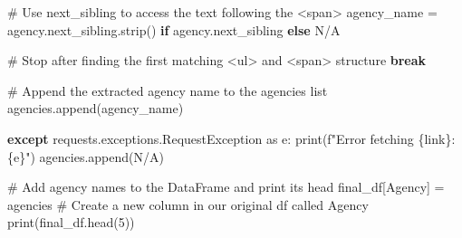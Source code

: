 \documentclass[
  letterpaper,
  DIV=11,
  numbers=noendperiod]{scrartcl}
\newenvironment{Shaded}{\begin{snugshade}}{\end{snugshade}}
\newcommand{\BuiltInTok}[1]{\textcolor[rgb]{0.00,0.23,0.31}{#1}}
\newcommand{\CommentTok}[1]{\textcolor[rgb]{0.37,0.37,0.37}{#1}}
\newcommand{\ControlFlowTok}[1]{\textcolor[rgb]{0.00,0.23,0.31}{\textbf{#1}}}
\newcommand{\DecValTok}[1]{\textcolor[rgb]{0.68,0.00,0.00}{#1}}
\newcommand{\ImportTok}[1]{\textcolor[rgb]{0.00,0.46,0.62}{#1}}
\newcommand{\NormalTok}[1]{\textcolor[rgb]{0.00,0.23,0.31}{#1}}
\newcommand{\OperatorTok}[1]{\textcolor[rgb]{0.37,0.37,0.37}{#1}}
\newcommand{\SpecialCharTok}[1]{\textcolor[rgb]{0.37,0.37,0.37}{#1}}
\newcommand{\SpecialStringTok}[1]{\textcolor[rgb]{0.13,0.47,0.30}{#1}}
\newcommand{\StringTok}[1]{\textcolor[rgb]{0.13,0.47,0.30}{#1}}
\begin{document}
\begin{Shaded}
\begin{Highlighting}[]
                    \CommentTok{\# Use next\_sibling to access the text following the \textless{}span\textgreater{}}
\NormalTok{                    agency\_name }\OperatorTok{=}\NormalTok{ agency.next\_sibling.strip() }\ControlFlowTok{if}\NormalTok{ agency.next\_sibling }\ControlFlowTok{else} \StringTok{\textquotesingle{}N/A\textquotesingle{}}
                    
                    \CommentTok{\# Stop after finding the first matching \textless{}ul\textgreater{} and \textless{}span\textgreater{} structure}
                    \ControlFlowTok{break}
            
            \CommentTok{\# Append the extracted agency name to the agencies list}
\NormalTok{            agencies.append(agency\_name)}

        \ControlFlowTok{except}\NormalTok{ requests.exceptions.RequestException }\ImportTok{as}\NormalTok{ e:}
            \BuiltInTok{print}\NormalTok{(}\SpecialStringTok{f"Error fetching }\SpecialCharTok{\{}\NormalTok{link}\SpecialCharTok{\}}\SpecialStringTok{: }\SpecialCharTok{\{}\NormalTok{e}\SpecialCharTok{\}}\SpecialStringTok{"}\NormalTok{)}
\NormalTok{            agencies.append(}\StringTok{\textquotesingle{}N/A\textquotesingle{}}\NormalTok{)}

\CommentTok{\# Add agency names to the DataFrame and print its head}
\NormalTok{final\_df[}\StringTok{\textquotesingle{}Agency\textquotesingle{}}\NormalTok{] }\OperatorTok{=}\NormalTok{ agencies  }\CommentTok{\# Create a new column in our original df called Agency}
\BuiltInTok{print}\NormalTok{(final\_df.head(}\DecValTok{5}\NormalTok{))}
\end{Highlighting}
\end{Shaded}
\end{document}
